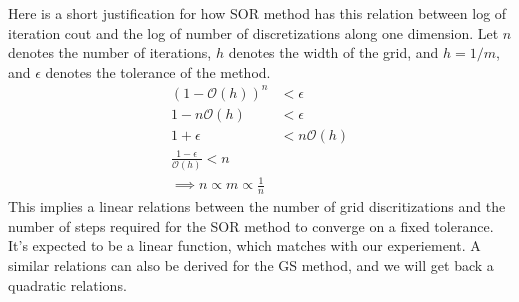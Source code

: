 \documentclass[]{article}
\begin{document}
    \par
    Here is a short justification for how SOR method has this relation between log of iteration cout and the log of number of discretizations along one dimension. Let $n$ denotes the number of iterations, $h$ denotes the width of the grid, and $h = 1/m$, and $\epsilon$ denotes the tolerance of the method. 
    \begin{align*}\tag{2.1}\label{eqn:2.1}
        (1 - \mathcal{O}(h))^n &< \epsilon
        \\
        1 - n\mathcal{O}(h) &<  \epsilon
        \\
        1 + \epsilon &< n\mathcal{O}(h)
        \\
        \frac{1 - \epsilon}{\mathcal{O}(h)} < n
        \\
        \implies n \propto m \propto \frac{1}{n}
    \end{align*}
    This implies a linear relations between the number of grid discritizations and the number of steps required for the SOR method to converge on a fixed tolerance. It's expected to be a linear function, which matches with our experiement. A similar relations can also be derived for the GS method, and we will get back a quadratic relations. 
    
\end{document}

